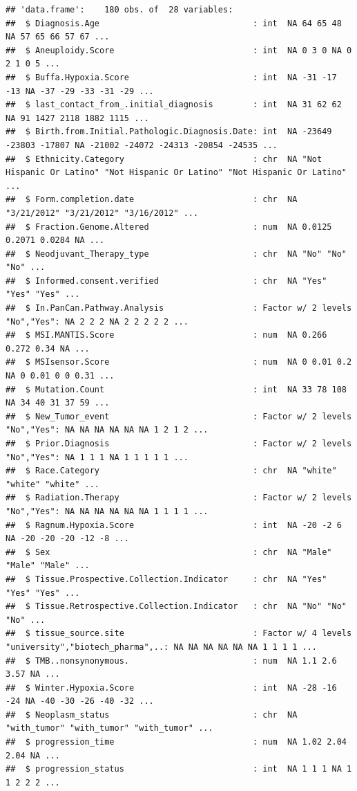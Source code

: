 \documentclass[
  11pt,
]{article}
\begin{document}
\begin{verbatim}
## 'data.frame':    180 obs. of  28 variables:
##  $ Diagnosis.Age                               : int  NA 64 65 48 NA 57 65 66 57 67 ...
##  $ Aneuploidy.Score                            : int  NA 0 3 0 NA 0 2 1 0 5 ...
##  $ Buffa.Hypoxia.Score                         : int  NA -31 -17 -13 NA -37 -29 -33 -31 -29 ...
##  $ last_contact_from_.initial_diagnosis        : int  NA 31 62 62 NA 91 1427 2118 1882 1115 ...
##  $ Birth.from.Initial.Pathologic.Diagnosis.Date: int  NA -23649 -23803 -17807 NA -21002 -24072 -24313 -20854 -24535 ...
##  $ Ethnicity.Category                          : chr  NA "Not Hispanic Or Latino" "Not Hispanic Or Latino" "Not Hispanic Or Latino" ...
##  $ Form.completion.date                        : chr  NA "3/21/2012" "3/21/2012" "3/16/2012" ...
##  $ Fraction.Genome.Altered                     : num  NA 0.0125 0.2071 0.0284 NA ...
##  $ Neodjuvant_Therapy_type                     : chr  NA "No" "No" "No" ...
##  $ Informed.consent.verified                   : chr  NA "Yes" "Yes" "Yes" ...
##  $ In.PanCan.Pathway.Analysis                  : Factor w/ 2 levels "No","Yes": NA 2 2 2 NA 2 2 2 2 2 ...
##  $ MSI.MANTIS.Score                            : num  NA 0.266 0.272 0.34 NA ...
##  $ MSIsensor.Score                             : num  NA 0 0.01 0.2 NA 0 0.01 0 0 0.31 ...
##  $ Mutation.Count                              : int  NA 33 78 108 NA 34 40 31 37 59 ...
##  $ New_Tumor_event                             : Factor w/ 2 levels "No","Yes": NA NA NA NA NA NA 1 2 1 2 ...
##  $ Prior.Diagnosis                             : Factor w/ 2 levels "No","Yes": NA 1 1 1 NA 1 1 1 1 1 ...
##  $ Race.Category                               : chr  NA "white" "white" "white" ...
##  $ Radiation.Therapy                           : Factor w/ 2 levels "No","Yes": NA NA NA NA NA NA 1 1 1 1 ...
##  $ Ragnum.Hypoxia.Score                        : int  NA -20 -2 6 NA -20 -20 -20 -12 -8 ...
##  $ Sex                                         : chr  NA "Male" "Male" "Male" ...
##  $ Tissue.Prospective.Collection.Indicator     : chr  NA "Yes" "Yes" "Yes" ...
##  $ Tissue.Retrospective.Collection.Indicator   : chr  NA "No" "No" "No" ...
##  $ tissue_source.site                          : Factor w/ 4 levels "university","biotech_pharma",..: NA NA NA NA NA NA 1 1 1 1 ...
##  $ TMB..nonsynonymous.                         : num  NA 1.1 2.6 3.57 NA ...
##  $ Winter.Hypoxia.Score                        : int  NA -28 -16 -24 NA -40 -30 -26 -40 -32 ...
##  $ Neoplasm_status                             : chr  NA "with_tumor" "with_tumor" "with_tumor" ...
##  $ progression_time                            : num  NA 1.02 2.04 2.04 NA ...
##  $ progression_status                          : int  NA 1 1 1 NA 1 1 2 2 2 ...
\end{verbatim}
\end{document}
